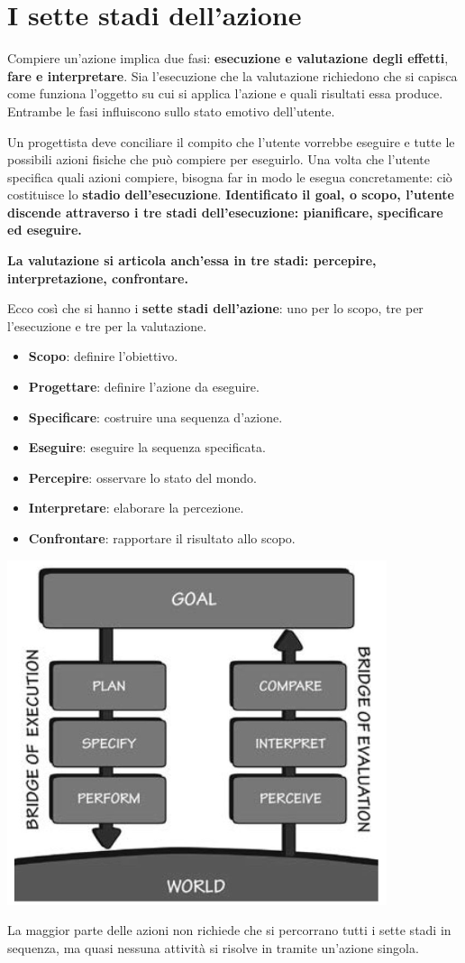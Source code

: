 \documentclass[a4paper,11pt,oneside]{book}
\begin{document}
\section{I sette stadi dell'azione}
Compiere un'azione implica due fasi: \textbf{esecuzione e valutazione degli effetti}, \textbf{fare e interpretare}. Sia l'esecuzione che la valutazione richiedono che si capisca come funziona l'oggetto su cui si applica l'azione e quali risultati essa produce. Entrambe le fasi influiscono sullo stato emotivo dell'utente.

Un progettista deve conciliare il compito che l'utente vorrebbe eseguire e tutte le possibili azioni fisiche che può compiere per eseguirlo. Una volta che l'utente specifica quali azioni compiere, bisogna far in modo le esegua concretamente: ciò costituisce lo \textbf{stadio dell'esecuzione}. \textbf{Identificato il goal, o scopo, l'utente discende attraverso i tre stadi dell'esecuzione: pianificare, specificare ed eseguire.}

\textbf{La valutazione si articola anch'essa in tre stadi: percepire, interpretazione, confrontare.}

Ecco così che si hanno i \textbf{sette stadi dell'azione}: uno per lo scopo, tre per l'esecuzione e tre per la valutazione.
\begin{itemize}
	\item \textbf{Scopo}: definire l'obiettivo.
	\item \textbf{Progettare}: definire l'azione da eseguire.
	\item \textbf{Specificare}: costruire una sequenza d'azione.
	\item \textbf{Eseguire}: eseguire la sequenza specificata.
	\item \textbf{Percepire}: osservare lo stato del mondo.
	\item \textbf{Interpretare}: elaborare la percezione.
	\item \textbf{Confrontare}: rapportare il risultato allo scopo.
\end{itemize}
\begin{center}
	\includegraphics[width=0.5\linewidth]{immagini/Sette stadi.png}
\end{center}
La maggior parte delle azioni non richiede che si percorrano tutti i sette stadi in sequenza, ma quasi nessuna attività si risolve in tramite un'azione singola.
\end{document}
